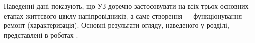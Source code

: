 




Наведенні дані показують, що УЗ доречно застосовувати на всіх трьох основних етапах життєвого циклу напіпровідників,
а саме створення --- функціонування --- ремонт (характеризація).
Основні результати огляду, наведеного у розділі, представлені в роботах \cite{Olikh:SEMT2004,Olikh:SEMT2011,1UNCPS,2013Buk}.





%








